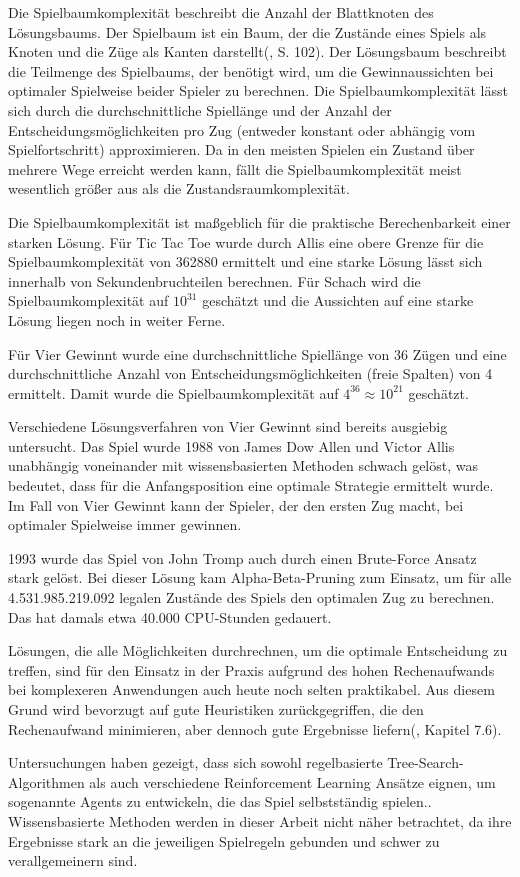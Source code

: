 Die Spielbaumkomplexität beschreibt die Anzahl der Blattknoten des Lösungsbaums. Der Spielbaum ist ein Baum, der die Zustände eines Spiels als Knoten und die Züge als Kanten darstellt(\cite{Bewersdorff.2018}, S. 102). Der Lösungsbaum beschreibt die Teilmenge des Spielbaums, der benötigt wird, um die Gewinnaussichten bei optimaler Spielweise beider Spieler zu berechnen. Die Spielbaumkomplexität lässt sich durch die durchschnittliche Spiellänge und der Anzahl der Entscheidungsmöglichkeiten pro Zug (entweder konstant oder abhängig vom Spielfortschritt) approximieren. Da in den meisten Spielen ein Zustand über mehrere Wege erreicht werden kann, fällt die Spielbaumkomplexität meist wesentlich größer aus als die Zustandsraumkomplexität\cite{Allis.1994}.

Die Spielbaumkomplexität ist maßgeblich für die praktische Berechenbarkeit einer starken Lösung. Für Tic Tac Toe wurde durch Allis eine obere Grenze für die Spielbaumkomplexität von 362880 ermittelt und eine starke Lösung lässt sich innerhalb von Sekundenbruchteilen berechnen\cite{Paul.2009}. Für Schach wird die Spielbaumkomplexität auf $10^{31}$ geschätzt und die Aussichten auf eine starke Lösung liegen noch in weiter Ferne\cite{Schaeffer.2007}.

Für Vier Gewinnt wurde eine durchschnittliche Spiellänge von 36 Zügen und eine durchschnittliche Anzahl von Entscheidungsmöglichkeiten (freie Spalten) von 4 ermittelt. Damit wurde die Spielbaumkomplexität auf $4^{36} \approx 10^{21}$ geschätzt\cite{Allis.1994}.

Verschiedene Lösungsverfahren von Vier Gewinnt sind bereits ausgiebig untersucht. Das Spiel wurde 1988 von James Dow Allen und Victor Allis unabhängig voneinander mit wissensbasierten Methoden schwach gelöst, was bedeutet, dass für die Anfangsposition eine optimale Strategie ermittelt wurde. Im Fall von Vier Gewinnt kann der Spieler, der den ersten Zug macht, bei optimaler Spielweise immer gewinnen\cite{Allen.2010}\cite{Allis.1988}.

1993 wurde das Spiel von John Tromp auch durch einen Brute-Force Ansatz stark gelöst. Bei dieser Lösung kam Alpha-Beta-Pruning zum Einsatz, um für alle 4.531.985.219.092 legalen Zustände des Spiels den optimalen Zug zu berechnen. Das hat damals etwa 40.000 CPU-Stunden gedauert\cite{Tromp}.

Lösungen, die alle Möglichkeiten durchrechnen, um die optimale Entscheidung zu treffen, sind für den Einsatz in der Praxis aufgrund des hohen Rechenaufwands bei komplexeren Anwendungen auch heute noch selten praktikabel. Aus diesem Grund wird bevorzugt auf gute Heuristiken zurückgegriffen, die den Rechenaufwand minimieren, aber dennoch gute Ergebnisse liefern(\cite{Heineman.October2008}, Kapitel 7.6).

Untersuchungen haben gezeigt, dass sich sowohl regelbasierte Tree-Search-Algorithmen als auch verschiedene Reinforcement Learning Ansätze eignen, um sogenannte Agents zu entwickeln, die das Spiel selbstständig spielen.\cite{Alderton.2019}\cite{Thill.2012}\cite{Wäldchen.2022}\cite{Taylor.2024}\cite{Sheoran.2022}\cite{Qiu.2022}. Wissensbasierte Methoden werden in dieser Arbeit nicht näher betrachtet, da ihre Ergebnisse stark an die jeweiligen Spielregeln gebunden und schwer zu verallgemeinern sind.
